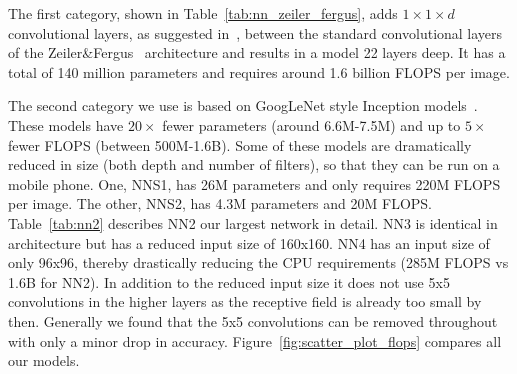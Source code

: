 \documentclass[10pt,twocolumn,letterpaper]{article}
\newcommand\note[1]{\textcolor{red}{Note: #1}}
\begin{document}
The first category, shown in Table~\ref{tab:nn_zeiler_fergus}, adds
$1{\times}1{\times}d$ convolutional layers, as suggested
in~\cite{networkinnetwork}, between the standard convolutional layers of the
Zeiler\&Fergus~\cite{zeilerfergus} architecture and results in a model 22
layers deep. It has a total of 140 million parameters and requires around 1.6
billion FLOPS per image.

The second category we use is based on GoogLeNet style Inception
models~\cite{SzegedyILSVRC2014}. These models have $20{\times}$ fewer
parameters (around 6.6M-7.5M) and up to $5{\times}$ fewer FLOPS (between
500M-1.6B). Some of these models are dramatically reduced in size (both depth
and number of filters), so that they can be run on a mobile phone.
One, NNS1, has 26M parameters and only requires 220M FLOPS per image. The
other, NNS2, has 4.3M parameters and 20M FLOPS. Table~\ref{tab:nn2} describes
NN2 our largest network in detail. NN3 is identical in architecture but has a
reduced input size of 160x160. NN4 has an input size of only 96x96, thereby
drastically reducing the CPU requirements (285M FLOPS vs 1.6B for NN2). In
addition to the reduced input size it does not use 5x5 convolutions in the
higher layers as the receptive field is already too small by then. Generally we
found that the 5x5 convolutions can be removed throughout with only a minor
drop in accuracy. Figure~\ref{fig:scatter_plot_flops} compares all our models.
\end{document}
